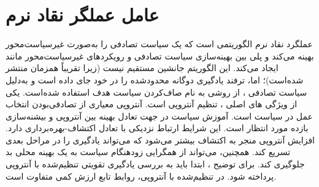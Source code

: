 \section{عامل عملگر نقاد نرم}\label{sec:SAC}
عملگرد نقاد نرم
 الگوریتمی است که یک سیاست تصادفی را به‌صورت  غیرسیاست‌محور بهینه می‌کند و پلی بین بهینه‌سازی سیاست تصادفی و رویکردهای غیرسیاست‌محور 
  مانند
  ایجاد می‌کند. این الگوریتم جانشین مستقیم 
  نیست (زیرا تقریباً همزمان منتشر شده‌است)؛ اما، ترفند یادگیری دوگانه محدود‌شده را در خود جای داده است و به‌دلیل سیاست تصادفی ، از روشی به نام صاف‌کردن سیاست هدف
    استفاده شده‌است.
یکی از ویژگی های اصلی ، تنظیم آنتروپی است.
آنتروپی معیاری از تصادفی‌بودن انتخاب عمل در سیاست است.
 آموزش سیاست در جهت تعادل بهینه بین آنتروپی و بیشنه‌سازی  بازده مورد انتظار است.
  این شرایط ارتباط نزدیکی با تعادل اکتشاف-بهره‌برداری دارد. افزایش آنتروپی منجر به اکتشاف بیشتر می‌شود که می‌تواند یادگیری را در مراحل بعدی تسریع کند. همچنین، می‌تواند از همگرایی زودهنگام سیاست به یک بهینه محلی بد جلوگیری کند.
 برای توضیح ، ابتدا باید به بررسی یادگیری تقویتی تنظیم‌شده با آنتروپی
  پرداخته شود. در  تنظیم‌شده با آنتروپی، روابط تابع ارزش کمی متفاوت است.
 
%      
      
  
